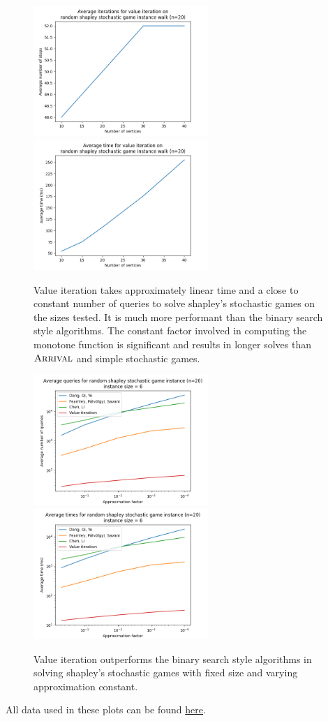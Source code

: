   \vspace{-20pt}
  \begin{figure}[H]
      \centering
      \includegraphics[width=2.6in]{plots/shapley_iterations.png}
      \centering
      \includegraphics[width=2.6in]{plots/shapley_iter_time.png}
      \caption{ Value iteration takes approximately linear time
      and a close to constant number of queries to solve shapley's stochastic games on the sizes tested.
      It is much more performant than the binary search style algorithms. The constant factor involved in
      computing the monotone function is significant and results in longer solves than $\textsc{Arrival}$ and simple stochastic games.} \label{shapleyWalkPlot}
  \end{figure}
  \vspace{-20pt}
  \begin{figure}[H]
      \centering
      \includegraphics[width=2.6in]{plots/shapley_eps_queries.png}
      \centering
      \includegraphics[width=2.6in]{plots/shapley_eps_times.png}
      \caption{ Value iteration outperforms the binary search style algorithms in solving
      shapley's stochastic games with fixed size and varying approximation constant.} \label{shapleyApproxPlot}
  \end{figure}
  All data used in these plots can be found \href{https://github.com/angusjoshi/tarski/blob/main/src/analysis/makePlots.py}{here}.
